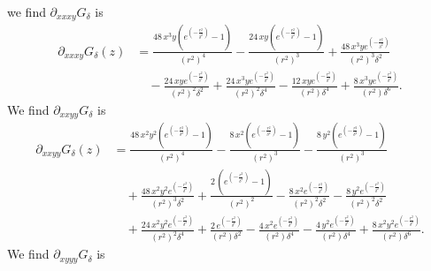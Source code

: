 \documentclass[12pt]{amsart}
\begin{document}
we find $\partial_{xxxy}G_\delta$ is
\begin{align*}
  \partial_{xxxy}G_\delta(z) &= \frac{48 \, x^{3} y {\left(e^{\left(-\frac{r^{2}}{\delta^{2}}\right)} - 1\right)}}{{\left(r^{2}\right)}^{4}}
   - \frac{24 \, x y {\left(e^{\left(-\frac{r^{2}}{\delta^{2}}\right)} -1\right)}}{{\left(r^{2}\right)}^{3}} 
   + \frac{48 \, x^{3} y e^{\left(-\frac{r^{2}}{\delta^{2}}\right)}}{{\left(r^{2}\right)}^{3} \delta^{2}} \\
   &\quad - \frac{24 \, x y e^{\left(-\frac{r^{2}}{\delta^{2}}\right)}}{{\left(r^{2}\right)}^{2} \delta^{2}} 
   +\frac{24 \, x^{3} y e^{\left(-\frac{r^{2}}{\delta^{2}}\right)}}{{\left(r^{2}\right)}^{2} \delta^{4}} 
   -\frac{12 \, x y e^{\left(-\frac{r^{2}}{\delta^{2}}\right)}}{{\left(r^{2}\right)} \delta^{4}} 
   + \frac{8 \,x^{3} y e^{\left(-\frac{r^{2}}{\delta^{2}}\right)}}{{\left(r^{2}\right)} \delta^{6}}.
\end{align*}
We find $\partial_{xxyy}G_\delta$ is
\begin{align*}
  \partial_{xxyy}G_\delta(z) &= \frac{48 \, x^{2} y^{2} {\left(e^{\left(-\frac{r^{2}}{\delta^{2}}\right)} - 1\right)}}{{\left(r^{2}\right)}^{4}} 
  - \frac{8 \, x^{2} {\left(e^{\left(-\frac{r^{2}}{\delta^{2}}\right)} - 1\right)}}{{\left(r^{2}\right)}^{3}} 
  - \frac{8 \, y^{2}{\left(e^{\left(-\frac{r^{2}}{\delta^{2}}\right)} -1\right)}}{{\left(r^{2}\right)}^{3}} \\
  &\quad + \frac{48 \, x^{2} y^{2}e^{\left(-\frac{r^{2}}{\delta^{2}}\right)}}{{\left(r^{2}\right)}^{3} \delta^{2}} 
  + \frac{2 \, {\left(e^{\left(-\frac{r^{2}}{\delta^{2}}\right)} - 1\right)}}{{\left(r^{2}\right)}^{2}} 
  - \frac{8 \, x^{2} e^{\left(-\frac{r^{2}}{\delta^{2}}\right)}}{{\left(r^{2}\right)}^{2} \delta^{2}} 
  - \frac{8\, y^{2} e^{\left(-\frac{r^{2}}{\delta^{2}}\right)}}{{\left(r^{2}\right)}^{2} \delta^{2}} \\
  &\quad + \frac{24 \, x^{2} y^{2} e^{\left(-\frac{r^{2}}{\delta^{2}}\right)}}{{\left(r^{2}\right)}^{2} \delta^{4}} 
  + \frac{2 \, e^{\left(-\frac{r^{2}}{\delta^{2}}\right)}}{{\left(r^{2}\right)} \delta^{2}} 
  - \frac{4 \, x^{2} e^{\left(-\frac{r^{2}}{\delta^{2}}\right)}}{{\left(r^{2}\right)} \delta^{4}} 
  - \frac{4 \,y^{2} e^{\left(-\frac{r^{2}}{\delta^{2}}\right)}}{{\left(r^{2}\right)} \delta^{4}} 
  + \frac{8 \, x^{2} y^{2} e^{\left(-\frac{r^{2}}{\delta^{2}}\right)}}{{\left(r^{2}\right)} \delta^{6}}.
\end{align*}
We find $\partial_{xyyy}G_\delta$ is
\end{document}
